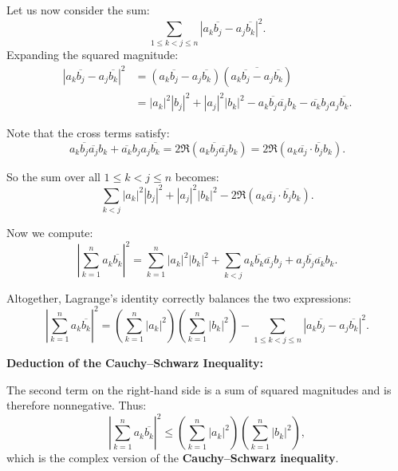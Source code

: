 Let us now consider the sum:
\[
\sum_{1 \leq k < j \leq n} |a_k \overline{b_j} - a_j \overline{b_k}|^2.
\]
Expanding the squared magnitude:
\begin{align*}
|a_k \overline{b_j} - a_j \overline{b_k}|^2 
&= (a_k \overline{b_j} - a_j \overline{b_k})(\overline{a_k \overline{b_j} - a_j \overline{b_k}}) \\
&= |a_k|^2 |b_j|^2 + |a_j|^2 |b_k|^2 - a_k \overline{b_j} \overline{a_j} b_k - \overline{a_k} b_j a_j \overline{b_k}.
\end{align*}

Note that the cross terms satisfy:
\[
a_k \overline{b_j} \overline{a_j} b_k + \overline{a_k} b_j a_j \overline{b_k}
= 2 \Re(a_k \overline{b_j} \overline{a_j} b_k) = 2 \Re(a_k \overline{a_j} \cdot \overline{b_j} b_k).
\]

So the sum over all \( 1 \leq k < j \leq n \) becomes:
\[
\sum_{k<j} |a_k|^2 |b_j|^2 + |a_j|^2 |b_k|^2 - 2 \Re(a_k \overline{a_j} \cdot \overline{b_j} b_k).
\]

Now we compute:
\[
\left| \sum_{k=1}^n a_k \overline{b_k} \right|^2 = \sum_{k=1}^n |a_k|^2 |b_k|^2 + \sum_{k < j} a_k \overline{b_k} \overline{a_j} b_j + a_j \overline{b_j} \overline{a_k} b_k.
\]

Altogether, Lagrange’s identity correctly balances the two expressions:
\[
\left| \sum_{k=1}^n a_k \overline{b_k} \right|^2 
= \left( \sum_{k=1}^n |a_k|^2 \right)\left( \sum_{k=1}^n |b_k|^2 \right)
- \sum_{1 \leq k < j \leq n} |a_k \overline{b_j} - a_j \overline{b_k}|^2.
\]

\vspace{0.5em}
\textbf{Deduction of the Cauchy–Schwarz Inequality:}

The second term on the right-hand side is a sum of squared magnitudes and is therefore nonnegative. Thus:
\[
\left| \sum_{k=1}^n a_k \overline{b_k} \right|^2 \leq \left( \sum_{k=1}^n |a_k|^2 \right)\left( \sum_{k=1}^n |b_k|^2 \right),
\]
which is the complex version of the \textbf{Cauchy–Schwarz inequality}.


